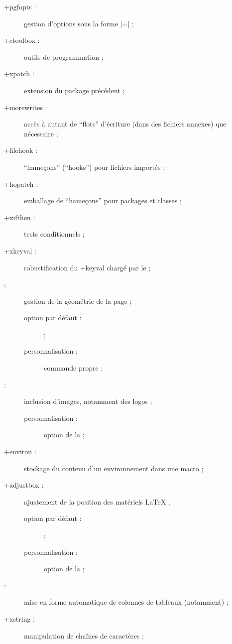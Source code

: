 \begin{description}
\item[\package*+{pgfopts} :] gestion d'options sous la forme
  |=| ;
\item[\package*+{etoolbox} :] outils de programmation ;
\item[\package*+{xpatch} :] extension du package précédent ;
\item[\package*+{morewrites} :] accès à autant de \enquote{flots} d'écriture
  (dans des fichiers annexes) que nécessaire ;
\item[\package*+{filehook} :] \enquote{hameçons} (\foreignquote{english}{hooks})
  pour fichiers importés ;
\item[\package*+{hopatch} :] emballage de \enquote{hameçons} pour packages et
  classes ;
\item[\package*+{xifthen} :] tests conditionnels ;
\item[\package*+{xkeyval} :] robustification du \Package+{keyval} chargé par le
   ;
\item[ :] gestion de la géométrie de la page ;
  \begin{description}
  \item[option par défaut :]  ;
  \item[personnalisation :] commande propre  ;
  \end{description}
\item[ :] inclusion d'images, notamment des logos ;
  \begin{description}
  \item[personnalisation :] option  de la \yatCl ;
  \end{description}
\item[\package*+{environ} :] stockage du contenu d'un environnement dans une
  macro ;
\item[\package+{adjustbox} :] ajustement de la position des matériels
  \LaTeX{} ;
  \begin{description}
  \item[option par défaut :]  ;
  \item[personnalisation :] option  de la \yatCl ;
  \end{description}
\item[ :] mise en forme automatique de colonnes de tableaux
  (notamment) ;
\item[\package*+{xstring} :] manipulation de chaînes de caractères ;

\end{description}

